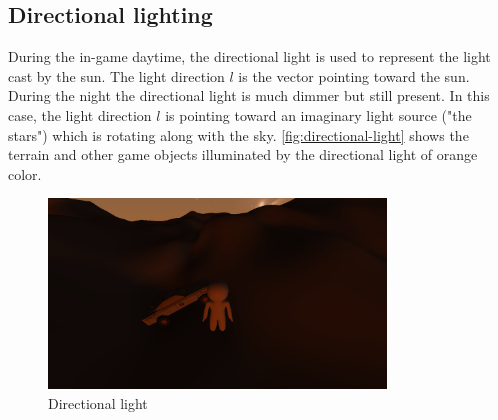 \subsection{Directional lighting} \label{subsec:directional-lighting}
During the in-game daytime, the directional light is used to represent the light cast by the sun.
The light direction $l$ is the vector pointing toward the sun.
During the night the directional light is much dimmer but still present.
In this case, the light direction $l$ is pointing toward an imaginary light source ("the stars") which is rotating along with the sky.
\autoref{fig:directional-light} shows the terrain and other game objects illuminated by the directional light of orange color.
\begin{figure}[h]
    \centering
    \includegraphics[width=0.8\textwidth]{chapters/theoretical_foundations/sections/lighting/resources/directional-light.png}
    \caption{Directional light}
    \label{fig:directional-light}
\end{figure}